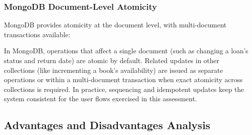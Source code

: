 \documentclass[12pt,a4paper]{article}
\begin{document}
\subsubsection{MongoDB Document-Level Atomicity}
MongoDB provides atomicity at the document level, with multi-document transactions available:

\begin{comment}
\begin{lstlisting}[language=Java, caption=MongoDB Atomic Operations]
@Override
public boolean returnLoan(int loanId) {
    // MongoDB operations are atomic at document level
    Document existingLoan = loans.find(Filters.eq("loan_id", loanId)).first();
    if (existingLoan == null || "RETURNED".equals(existingLoan.getString("status"))) {
        throw new IllegalStateException("Loan not found or already returned");
    }
    
    // Update loan document atomically
    Document update = new Document("status", "RETURNED")
        .append("return_date", formatDate(LocalDate.now()));
    
    boolean updated = loans.updateOne(
        Filters.and(
            Filters.eq("loan_id", loanId),
            Filters.ne("status", "RETURNED")),
        new Document("$set", update)).getModifiedCount() > 0;
    
    if (updated) {
        // Separate atomic operation for book availability
        Loan loan = getLoanById(loanId);
        if (loan != null) {
            books.updateOne(
                Filters.eq("book_id", loan.getBookId()),
                Updates.inc("available_copies", 1));
        }
    }
    return updated;
}
\end{lstlisting}
\end{comment}

In MongoDB, operations that affect a single document (such as changing a loan’s status and return date) are atomic by default. Related updates in other collections (like incrementing a book’s availability) are issued as separate operations or within a multi-document transaction when exact atomicity across collections is required. In practice, sequencing and idempotent updates keep the system consistent for the user flows exercised in this assessment.

\subsection{Advantages and Disadvantages Analysis}
\end{document}
